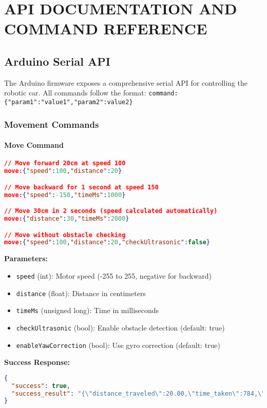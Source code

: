 \chapter{API DOCUMENTATION AND COMMAND REFERENCE}

\section{Arduino Serial API}

The Arduino firmware exposes a comprehensive serial API for controlling the robotic car. All commands follow the format: \texttt{command:\{"param1":"value1","param2":value2\}}

\subsection{Movement Commands}

\subsubsection{Move Command}

\begin{lstlisting}[language=json,caption=Move Command Examples]
// Move forward 20cm at speed 100
move:{"speed":100,"distance":20}

// Move backward for 1 second at speed 150
move:{"speed":-150,"timeMs":1000}

// Move 30cm in 2 seconds (speed calculated automatically)
move:{"distance":30,"timeMs":2000}

// Move without obstacle checking
move:{"speed":100,"distance":20,"checkUltrasonic":false}
\end{lstlisting}

\textbf{Parameters:}
\begin{itemize}
    \item \texttt{speed} (int): Motor speed (-255 to 255, negative for backward)
    \item \texttt{distance} (float): Distance in centimeters
    \item \texttt{timeMs} (unsigned long): Time in milliseconds
    \item \texttt{checkUltrasonic} (bool): Enable obstacle detection (default: true)
    \item \texttt{enableYawCorrection} (bool): Use gyro correction (default: true)
\end{itemize}

\textbf{Success Response:}
\begin{lstlisting}[language=json]
{
  "success": true,
  "success_result": "{\"distance_traveled\":20.00,\"time_taken\":784,\"final_yaw\":0.32}"
}
\end{lstlisting}

